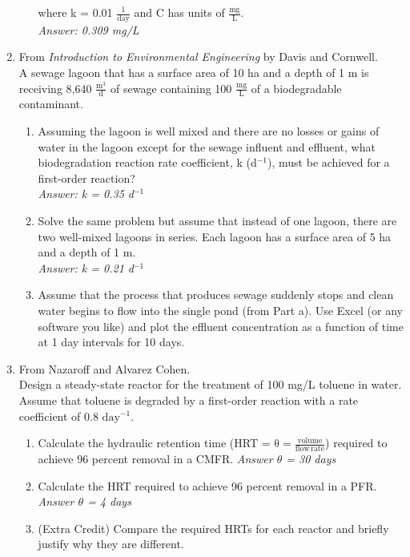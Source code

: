 \documentclass[12pt,letterpaper]{article}
\begin{document}
\begin{enumerate}
\begin{enumerate}
where k = 0.01 $\mathrm{\frac{1}{day}}$ and C has units of $\mathrm{\frac{mg}{L}}$.\\
\emph{Answer: 0.309 mg/L}
\end{enumerate}

\item From \emph{Introduction to Environmental Engineering} by Davis and Cornwell.\\
A sewage lagoon that has a surface area of 10 ha and a depth of 1 m is receiving 8,640 $\mathrm{\frac{m^3}{d}}$ of sewage containing 100 $\mathrm{\frac{mg}{L}}$ of a biodegradable contaminant.  
\begin{enumerate}
\item Assuming the lagoon is well mixed and there are no losses or gains of water in the lagoon except for the sewage influent and effluent, what biodegradation reaction rate coefficient, k (d$^{-1}$), must be achieved for a first-order reaction?\\
\emph{Answer: k = 0.35 d$^{-1}$}

\item Solve the same problem but assume that instead of one lagoon, there are two well-mixed lagoons in series.  Each lagoon has a surface area of 5 ha and a depth of 1 m.\\
\emph{Answer: k = 0.21 d$^{-1}$}

\item Assume that the process that produces sewage suddenly stops and clean water begins to flow into the single pond (from Part a).  Use Excel (or any software you like) and plot the effluent concentration as a function of time at 1 day intervals for 10 days. 
 
\end{enumerate}
\item From Nazaroff and Alvarez Cohen.\\
Design a steady-state reactor for the treatment of 100 mg/L toluene in water.  Assume that toluene is degraded by a first-order reaction with a rate coefficient of 0.8 $\mathrm{day^{-1}}$.
\begin{enumerate}
\item Calculate the hydraulic retention time (HRT = $\mathrm{\theta = \frac{volume}{flow\, rate}}$) required to achieve 96 percent removal in a CMFR. \emph{Answer $\theta$ = 30 days}
\item Calculate the HRT required to achieve 96 percent removal in a PFR. \emph{Answer $\theta$ = 4 days}
\item (Extra Credit) Compare the required HRTs for each reactor and briefly justify why they are different.
\end{enumerate}
\end{enumerate}
\end{document}
